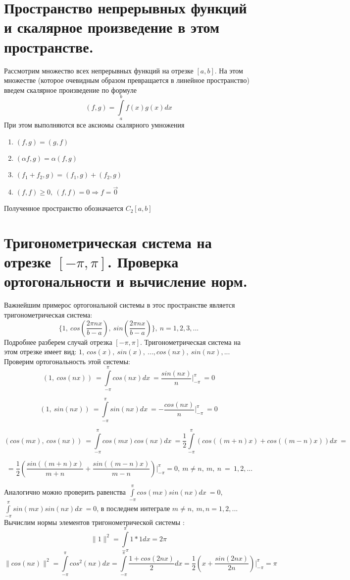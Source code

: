 \documentclass[12pt, a4paper]{article}
\begin{document}
\section{Пространство непрерывных функций и скалярное произведение в этом пространстве.}
Рассмотрим множество всех непрерывных функций на отрезке $[a, b]$.
На этом множестве (которое очевидным образом превращается в линейное пространство)
введем скалярное произведение по формуле
$$(f, g) = \int\limits_a^b f(x)g(x)dx$$
При этом выполняются все аксиомы скалярного умножения
\begin{enumerate}
    \item{$(f, g) = (g, f)$}
    \item{$(\alpha f, g) = \alpha(f, g)$}
    \item{$(f_1 + f_2, g) = (f_1, g) + (f_2, g)$}
    \item{$(f, f) \geq 0, \ (f, f) = 0 \Longrightarrow f = \overrightarrow{0} $}
\end{enumerate}
Полученное пространство обозначается $C_2[a, b]$
\section{Тригонометрическая система на отрезке $[-\pi, \pi]$. Проверка ортогональности и вычисление норм.}
Важнейшим примерос ортогональной системы в этос пространстве является 
тригонометрическая система:
$$\{1,\ cos(\frac{2\pi n x}{b-a}),\ sin(\frac{2\pi n x}{b-a})\}, \ n = 1, 2, 3, ...$$
Подробнее разберем случай отрезка $[-\pi, \pi]$. Тригонометрическая 
система на этом отрезке имеет вид: $1, \ cos(x), \ sin(x), \ ... ,cos(nx),\ sin(nx), ...$
Проверим ортогональность этой системы:
$$(1,\ cos(nx)) \ = \int\limits_{-\pi}^{\pi}cos(nx)dx \ = 
\frac{sin(nx)}{n}\bigg|_{-\pi}^{\pi} \ = 0$$

$$(1,\ sin(nx)) \ = \int\limits_{-\pi}^{\pi}sin(nx)dx \ = 
- \frac{cos(nx)}{n}\bigg|_{-\pi}^{\pi} \ = 0$$

$$(cos(mx),\ cos(nx)) \ = \int\limits_{-\pi}^{\pi}cos(mx)cos(nx)dx \ = 
\frac{1}{2} \int\limits_{-\pi}^{\pi}(cos((m + n)x) + cos((m - n)x))dx \ =
$$

$$\ = \frac{1}{2}(\frac{sin((m + n)x)}{m + n} + \frac{sin((m - n)x)}{m -n})\bigg|_{-\pi}^{\pi} = 0,\ m \ne n,\ m,\ n \ = \ 1, 2, ...$$

Аналогично можно проверить равенства $\int\limits_{-\pi}^{\pi}cos(mx)sin(nx)dx \ = 0$,
$\int\limits_{-\pi}^{\pi}sin(mx)sin(nx)dx \ = 0$, в последнем интеграле $m  \ne n, \ m, n = 1, 2, ...$
\newline
Вычислим нормы элементов тригонометрической системы :
$$
    \|1\|^2 = \int\limits_{-\pi}^{\pi}1 * 1 dx = 2\pi
$$
$$
    \| cos(nx) \|^2 = \int\limits_{-\pi}^{\pi}cos^2(nx)dx = 
    \int\limits_{-\pi}^{\pi}\frac{1 + cos(2nx)}{2}dx = 
    \frac{1}{2}(x  + \frac{sin(2nx)}{2n})\bigg|_{-\pi}^{\pi} = \pi
$$
\end{document}
